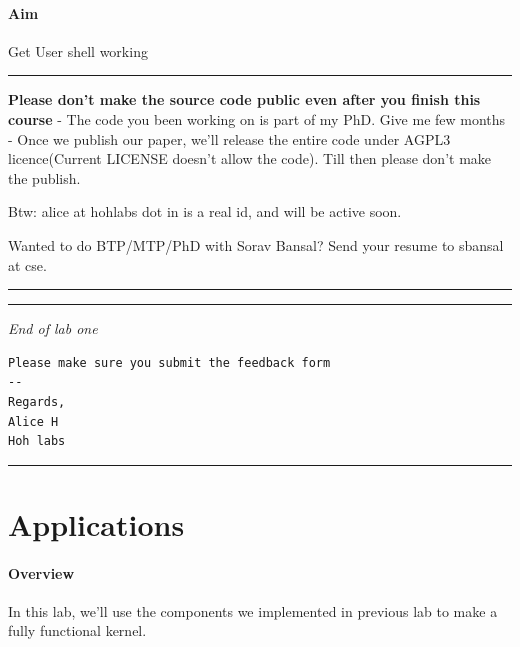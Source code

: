 \documentclass[]{book}
\begin{document}
\subsubsection*{Aim}\label{aim-14}

Get User shell working

\begin{center}\rule{0.5\linewidth}{\linethickness}\end{center}

\textbf{Please don't make the source code public even after you finish
this course} - The code you been working on is part of my PhD. Give me
few months - Once we publish our paper, we'll release the entire code
under AGPL3 licence(Current LICENSE doesn't allow the code). Till then
please don't make the publish.

Btw: alice at hohlabs dot in is a real id, and will be active soon.

Wanted to do BTP/MTP/PhD with Sorav Bansal? Send your resume to sbansal
at cse.

\begin{center}\rule{0.5\linewidth}{\linethickness}\end{center}

\begin{center}\rule{0.5\linewidth}{\linethickness}\end{center}

\emph{End of lab one}

\begin{verbatim}
Please make sure you submit the feedback form
--
Regards,
Alice H
Hoh labs
\end{verbatim}

\begin{center}\rule{0.5\linewidth}{\linethickness}\end{center}

\chapter{Applications}\label{applications}

\subsubsection*{Overview}\label{overview-1}

In this lab, we'll use the components we implemented in previous lab to
make a fully functional kernel.
\end{document}
